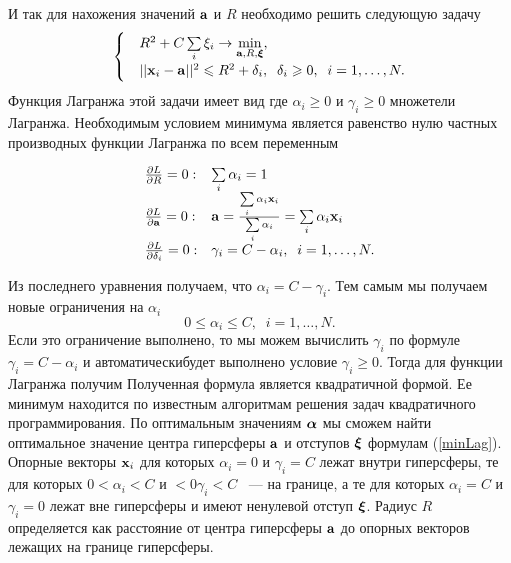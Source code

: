 И так для нахожения значений $\boldsymbol{\mathbf{a}}$ и $R$ необходимо решить следующую задачу
\begin{equation}
			\begin{cases}
			&R^2 + C\sum\limits_i\xi_i \to \min\limits_{\boldsymbol{\mathbf{a}}, R,\boldsymbol{\mathbf{\xi}}}, \\
			&||\boldsymbol{\mathbf{x}}_i-\boldsymbol{\mathbf{a}}||^2\leqslant R^2 + \delta_i,\;\;\delta_i\geqslant0,\;\;i = 1,\ldots,N.
			\end{cases} 
\end{equation}
Функция Лагранжа этой задачи имеет вид
где $\alpha_i\ge 0$  и $\gamma_i\ge 0$ множетели Лагранжа.
Необходимым условием минимума является равенство нулю частных производных функции Лагранжа по всем переменным

\begin{equation}
\label{minLag}
\begin{array}{ll}
\frac{\partial L}{\partial R} = 0: & \sum\limits_i \alpha_i = 1\\
\frac{\partial L}{\partial\boldsymbol{\mathbf{a}}} = 0: & \boldsymbol{\mathbf{a}} = \frac{\sum\limits_i\alpha_i\boldsymbol{\mathbf{x}}_i}{\sum\limits_i \alpha_i}= \sum\limits_i \alpha_i\boldsymbol{\mathbf{x}}_i\\
\frac{\partial L}{\partial\delta_i} = 0: & \gamma_i = C - \alpha_i, \;\; i = 1,\ldots,N.\\
\end{array}
\end{equation}

Из последнего уравнения получаем, что $\alpha_i = C - \gamma_i$. Тем самым мы получаем новые ограничения на $\alpha_i$ 
$$0\le\alpha_i\le C, \;\; i = 1,\ldots,N.$$
Если это ограничение выполнено, то мы можем вычислить $\gamma_i$ по формуле $\gamma_i = C - \alpha_i$ и автоматическибудет выполнено условие $\gamma_i\ge 0$.
Тогда для функции Лагранжа получим
Полученная формула является квадратичной формой. Ее минимум находится по известным алгоритмам решения задач квадратичного программирования. По оптимальным значениям $\boldsymbol{\mathbf{\alpha}}$ мы сможем найти оптимальное значение центра гиперсферы $\boldsymbol{\mathbf{a}}$ и отступов $\boldsymbol{\mathbf{\xi}}$  формулам (\ref{minLag}). Опорные векторы $\boldsymbol{\mathbf{x}}_i$ для которых $\alpha_i=0$ и $\gamma_i=C$ лежат внутри гиперсферы, те для которых $0<\alpha_i<C$ и $<0\gamma_i<C$ ~--- на границе, а те для которых $\alpha_i=C$ и $\gamma_i=0$ лежат вне гиперсферы и имеют ненулевой отступ $\boldsymbol{\mathbf{\xi}}$. Радиус $R$ определяется как расстояние от центра гиперсферы $\boldsymbol{\mathbf{a}}$ до опорных векторов лежащих на границе гиперсферы.
